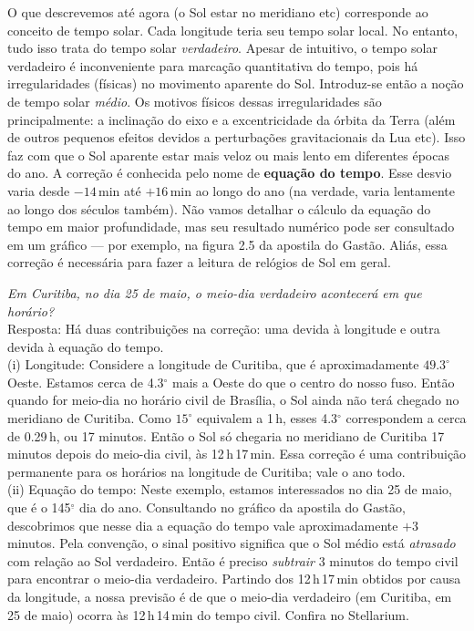 O que descrevemos até agora (o Sol estar no meridiano etc) corresponde ao conceito de tempo solar. Cada longitude teria seu tempo solar local. No entanto, tudo isso trata do tempo solar \textit{verdadeiro}. Apesar de intuitivo, o tempo solar verdadeiro é inconveniente para marcação quantitativa do tempo, pois há irregularidades (físicas) no movimento aparente do Sol. Introduz-se então a noção de tempo solar \textit{médio}. Os motivos físicos dessas irregularidades são principalmente: a inclinação do eixo e a excentricidade da órbita da Terra (além de outros pequenos efeitos devidos a perturbações gravitacionais da Lua etc). Isso faz com que o Sol aparente estar mais veloz ou mais lento em diferentes épocas do ano. A correção é conhecida pelo nome de \textbf{equação do tempo}. Esse desvio varia desde $-14$\,min até $+16$\,min ao longo do ano (na verdade, varia lentamente ao longo dos séculos também). Não vamos detalhar o cálculo da equação do tempo em maior profundidade, mas seu resultado numérico pode ser consultado em um gráfico --- por exemplo, na figura 2.5 da apostila do Gastão. Aliás, essa correção é necessária para fazer a leitura de relógios de Sol em geral.



\begin{exemplo}{11}
\textit{Em Curitiba, no dia 25 de maio, o meio-dia verdadeiro acontecerá em que horário?}\\

Resposta: Há duas contribuições na correção: uma devida à longitude e outra devida à equação do tempo.\\

(i) Longitude: Considere a longitude de Curitiba, que é aproximadamente $49.3^{\circ}$ Oeste. Estamos cerca de 4.3$^{\circ}$ mais a Oeste do que o centro do nosso fuso. Então quando for meio-dia no horário civil de Brasília, o Sol ainda não terá chegado no meridiano de Curitiba. Como $15^{\circ}$ equivalem a 1\,h, esses 4.3$^{\circ}$ correspondem a cerca de 0.29\,h, ou 17 minutos. Então o Sol só chegaria no meridiano de Curitiba 17 minutos depois do meio-dia civil, às 12\,h\,17\,min. Essa correção é uma contribuição permanente para os horários na longitude de Curitiba; vale o ano todo.\\

(ii) Equação do tempo: Neste exemplo, estamos interessados no dia 25 de maio, que é o 145$^{\underline{\circ}}$ dia do ano. Consultando no gráfico da apostila do Gastão, descobrimos que nesse dia a equação do tempo vale aproximadamente $+3$ minutos. Pela convenção, o sinal positivo significa que o Sol médio está \textit{atrasado} com relação ao Sol verdadeiro. Então é preciso \textit{subtrair} 3 minutos do tempo civil para encontrar o meio-dia verdadeiro. Partindo dos 12\,h\,17\,min obtidos por causa da longitude, a nossa previsão é de que o meio-dia verdadeiro (em Curitiba, em 25 de maio) ocorra às 12\,h\,14\,min do tempo civil. Confira no Stellarium.

\end{exemplo}

